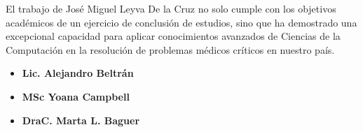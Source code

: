 \begin{opinion}
    El trabajo de José Miguel Leyva De la Cruz no solo cumple con los objetivos académicos de 
    un ejercicio de conclusión de estudios, sino que ha demostrado una excepcional capacidad 
    para aplicar conocimientos avanzados de Ciencias de la Computación en la resolución de 
    problemas médicos críticos en nuestro país.

    \begin{itemize}
        \item \textbf{Lic. Alejandro Beltrán}
        \item \textbf{MSc Yoana Campbell}
        \item \textbf{DraC. Marta L. Baguer}
    \end{itemize}
\end{opinion}
